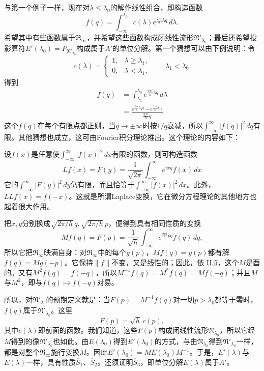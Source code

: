 \documentclass[fontsize=13pt,twoside,openany,headings=normal,parskip=false,bookmarkpackage=false,DIV=calc]{scrbook}
\begin{document}
与第一个例子一样，现在对$\lambda\leq\lambda_0$的解作线性组合，即构造函数
\[
f(q)=\int_{-\infty}^{\lambda_0}c(\lambda)e^{\frac{2\pi i}{h}\lambda q}\,d\lambda.
\]
希望其中有些函数属于$\mathfrak{R}_\infty$，并希望这些函数构成闭线性流形$\mathfrak{N}'_{\lambda_0}$；最后还希望投影算符$E'(\lambda_0)=P_{\mathfrak{N}'_{\lambda_0}}$构成属于$A'$的单位分解。第一个猜想可以由下例说明：令
\[
c(\lambda)=\begin{cases}1,&\lambda\geq\lambda_1,\\0,&\lambda<\lambda_1,\end{cases}
\qquad\lambda_1<\lambda_0.
\]
得到
\begin{align*}
f(q)&=\int_{\lambda_1}^{\lambda_0}e^{\frac{2\pi i}{h}\lambda q}\,d\lambda\\
&=\frac{e^{\frac{2\pi i}{h}\lambda_0q}-e^{\frac{2\pi i}{h}\lambda_1q}}{\frac{2\pi i}{h}q}.
\end{align*}
这个$f(q)$在每个有限点都正则，当$q\to\pm\infty$时按$1/q$衰减，所以$\int_{-\infty}^{\infty}|f(q)|^2\,dq$有限。其他猜想也成立，这可由Fourier积分理论推出。这个理论的内容如下：

设$f(x)$是任意使$\int_{-\infty}^{\infty}|f(x)|^2\,dx$有限的函数，则可构造函数
\[
Lf(x)=F(y)=\frac1{\sqrt{2\pi}}\int_{-\infty}^{\infty}e^{ixy}f(x)\,dx
\]
它的$\int_{-\infty}^{\infty}|F(y)|^2\,dy$仍有限，而且恰等于$\int_{-\infty}^{\infty}|f(x)|^2\,dx$。此外，$LLf(x)=f(-x)$。这就是所谓Laplace变换，它在微分方程理论的其他地方也起着很大作用。

\hypertarget{origpage-70}{}\label{origpage-70}把$x,\allowbreak y$分别换成$\sqrt{2\pi/h}\,q,\allowbreak \sqrt{2\pi/h}\,p$，便得到具有相同性质的变换
\[
Mf(q)=F(p)=\frac1{\sqrt h}\int_{-\infty}^{\infty}e^{\frac{2\pi i}{h}pq}f(q)\,dq,
\]
所以它把$\mathfrak{R}_\infty$映满自身：对$\mathfrak{R}_\infty$中的每个$g(p)$，$Mf(q)=g(p)$都有解$f(q)=Mg(-p)$。它保持$\|f\|$不变，又是线性的；因此，依 \hyperref[sec:II.5]{II.5}，这个$M$是酉的。又有$M^2f(q)=f(-q)$，所以$M^{-1}f(q)=M^*f(q)=Mf(-q)$；并且$M$与$M^2$，即与$f(q)\mapsto f(-q)$对易。

所以，对$\mathfrak{N}'_{\lambda_0}$的预期定义就是：当$F(p)=M^{-1}f(q)$对一切$p>\lambda_0$都等于零时，$f(q)$属于$\mathfrak{N}'_{\lambda_0}$。这里
\[
F(p)=\sqrt h\,c(p),
\]
其中$c(\lambda)$即前面的函数。我们知道，这些$F(p)$构成闭线性流形$\mathfrak{N}_{\lambda_0}$，所以它经$M$得到的像$\mathfrak{N}'_{\lambda_0}$也如此。由$E(\lambda_0)$得到$E'(\lambda_0)$的方式，与由$\mathfrak{N}_{\lambda_0}$得到$\mathfrak{N}'_{\lambda_0}$一样，都是对整个$\mathfrak{R}_\infty$施行变换$M$。因此$E'(\lambda_0)=ME(\lambda_0)M^{-1}$。于是，$E'(\lambda)$与$E(\lambda)$一样，具有性质$\hyperref[cond:II.Sbar1]{\overline{S}_1}$、$\hyperref[cond:II.Sbar2]{\overline{S}_2}$。还须证明$\hyperref[cond:II.Sbar3]{\overline{S}_3}$，即单位分解$E(\lambda)$属于$A'$。
\end{document}
